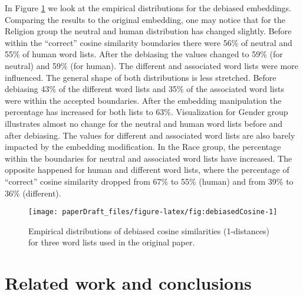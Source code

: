 \documentclass[
  12pt,
  dvipsnames,enabledeprecatedfontcommands]{scrartcl}
\begin{document}
In Figure \ref{fig:empiricalDebiased} we look at the empirical
distributions for the debiased embeddings. Comparing the results to the
original embedding, one may notice that for the Religion group the
neutral and human distribution has changed slightly. Before within the
``correct'' cosine similarity boundaries there were 56\% of neutral and
55\% of human word lists. After the debiasing the values changed to 59\%
(for neutral) and 59\% (for human). The different and associated word
lists were more influenced. The general shape of both distributions is
less stretched. Before debiasing 43\% of the different word lists and
35\% of the associated word lists were within the accepted boundaries.
After the embedding manipulation the percentage has increased for both
lists to 63\%. Visualization for Gender group illustrates almost no
change for the neutral and human word lists before and after debiasing.
The values for different and associated word lists are also barely
impacted by the embedding modification. In the Race group, the
percentage within the boundaries for neutral and associated word lists
have increased. The opposite happened for human and different word
lists, where the percentage of ``correct'' cosine similarity dropped
from 67\% to 55\% (human) and from 39\% to 36\% (different).

\pagebreak

\begin{figure}[H]

\begin{center}\texttt{[image: paperDraft\_files/figure-latex/fig:debiasedCosine-1]} \end{center}
\caption{Empirical distributions of debiased cosine similarities (1-distances) for three word lists used in  the original paper.}
\label{fig:empiricalDebiased}
\end{figure}

\hypertarget{related-work-and-conclusions}{%
\section{Related work and
conclusions}\label{related-work-and-conclusions}}
\end{document}
